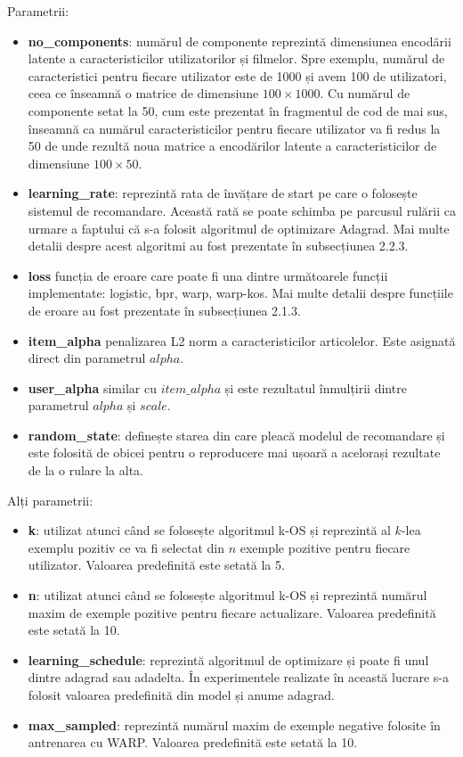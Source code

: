 Parametrii:
\begin{itemize}
  \item \textbf{no\_components}: numărul de componente reprezintă dimensiunea encodării latente a caracteristicilor utilizatorilor și filmelor. Spre exemplu, numărul de caracteristici pentru fiecare utilizator este de 1000 și avem 100 de utilizatori, ceea ce înseamnă o matrice de dimensiune $100 \times 1000$. Cu numărul de componente setat la 50, cum este prezentat în fragmentul de cod de mai sus, înseamnă ca numărul caracteristicilor pentru fiecare utilizator va fi redus la 50 de unde rezultă noua matrice a encodărilor latente a caracteristicilor de dimensiune $100 \times 50$.
  \item \textbf{learning\_rate}: reprezintă rata de învățare de start pe care o folosește sistemul de recomandare. Această rată se poate schimba pe parcusul rulării ca urmare a faptului că s-a folosit algoritmul de optimizare Adagrad. Mai multe detalii despre acest algoritmi au fost prezentate în subsecțiunea 2.2.3.
  \item \textbf{loss} funcția de eroare care poate fi una dintre următoarele funcții implementate: logistic, bpr, warp, warp-kos. Mai multe detalii despre funcțiile de eroare au fost prezentate în subsecțiunea 2.1.3.
  \item \textbf{item\_alpha} penalizarea L2 norm a caracteristicilor articolelor. Este asignată direct din parametrul $alpha$.
  \item \textbf{user\_alpha} similar cu $item\_alpha$ și este rezultatul înmulțirii dintre parametrul $alpha$ și $scale$.
  \item \textbf{random\_state}: definește starea din care pleacă modelul de recomandare și este folosită de obicei pentru o reproducere mai ușoară a acelorași rezultate de la o rulare la alta.
\end{itemize}

Alți parametrii:
\begin{itemize}
	\item \textbf{k}: utilizat atunci când se folosește algoritmul k-OS și reprezintă al $k$-lea exemplu pozitiv ce va fi selectat din $n$ exemple pozitive pentru fiecare utilizator. Valoarea predefinită este setată la 5.
	\item \textbf{n}: utilizat atunci când se folosește algoritmul k-OS și reprezintă numărul maxim de exemple pozitive pentru fiecare actualizare. Valoarea predefinită este setată la 10.
	\item \textbf{learning\_schedule}: reprezintă algoritmul de optimizare și poate fi unul dintre adagrad sau adadelta. În experimentele realizate în această lucrare s-a folosit valoarea predefinită din model și anume adagrad.
	\item \textbf{max\_sampled}: reprezintă numărul maxim de exemple negative folosite în antrenarea cu WARP. Valoarea predefinită este setată la 10.
\end{itemize}

